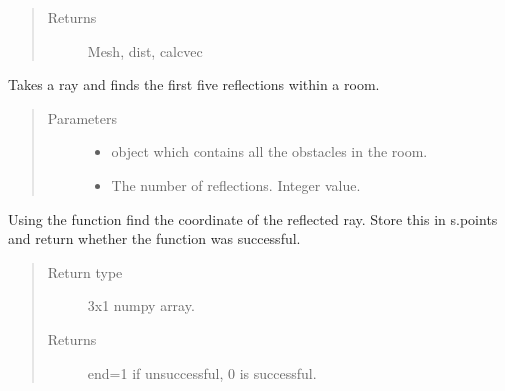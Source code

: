 \documentclass[letterpaper,10pt,english]{sphinxmanual}
\begin{document}
\begin{fulllineitems}
\begin{fulllineitems}
\begin{itemize}
\begin{itemize}
\end{itemize}

\end{itemize}
\begin{quote}\begin{description}
\item[{Returns}] \leavevmode
Mesh, dist, calcvec

\end{description}\end{quote}

\end{fulllineitems}


\begin{fulllineitems}
\label{\detokenize{index:Rays.Ray.multiref}}
Takes a ray and finds the first five reflections within a room.
\begin{quote}\begin{description}
\item[{Parameters}] \leavevmode\begin{itemize}
\item {} 
 \textendash{} {\hyperref[\detokenize{index:Room.room}]{}} object which     contains all the obstacles in the room.

\item {} 
 \textendash{} The number of reflections. Integer value.

\end{itemize}

\end{description}\end{quote}

Using the function  find the     co\sphinxhyphen{}ordinate of the reflected ray. Store this in s.points     and return whether the function was successful.
\begin{quote}\begin{description}
\item[{Return type}] \leavevmode
3x1 numpy array.

\item[{Returns}] \leavevmode
end=1 if unsuccessful, 0 is successful.


\end{description}
\end{quote}
\end{fulllineitems}
\end{fulllineitems}
\end{document}
